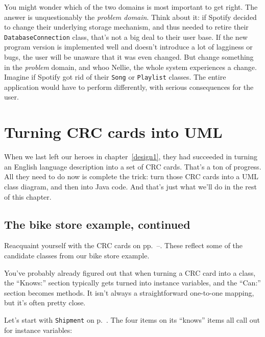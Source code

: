 You might wonder which of the two domains is most important to get right. The
answer is unquestionably the \textit{problem domain}. Think about it: if
Spotify decided to change their underlying storage mechanism, and thus
needed to retire their \texttt{DatabaseConnection} class, that's not a big deal to their
user base. If the new program version is implemented well and doesn't
introduce a lot of lagginess or bugs, the user will be unaware that it was
even changed. But change something in the \textit{problem} domain, and whoo
Nellie, the whole system experiences a change. Imagine if Spotify got rid of
their \texttt{Song} or \texttt{Playlist} classes. The entire application would
have to perform differently, with serious consequences for the user.


\section{Turning CRC cards into UML}

When we last left our heroes in chapter~\ref{design1}, they had succeeded in
turning an English language description into a set of CRC cards. That's a ton
of progress. All they need to do now is complete the trick: turn those CRC
cards into a UML class diagram, and then into Java code. And that's just what
we'll do in the rest of this chapter.

\subsection{The bike store example, continued}

Reacquaint yourself with the CRC cards on
pp.~\pageref{bikeCRC1}--\pageref{bikeCRC2}. These reflect some of the candidate
classes from our bike store example.

You've probably already figured out that when turning a CRC card into a class,
the ``Knows:'' section typically gets turned into instance variables, and the
``Can:'' section becomes methods. It isn't always a straightforward one-to-one
mapping, but it's often pretty close.

Let's start with \texttt{Shipment} on p.~\pageref{bikeCRC1}. The four items on
its ``knows'' items all call out for instance variables:

